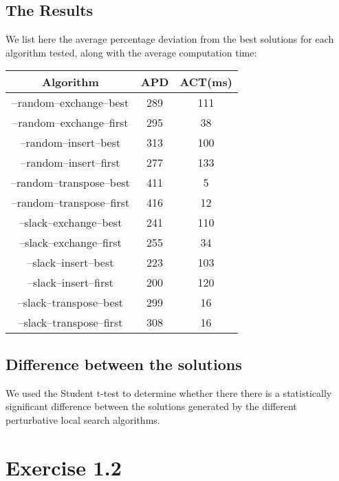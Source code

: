 \subsection{The Results}
We list here the average percentage deviation from the best solutions for each algorithm tested, along with the average computation time:

\begin{center}
	\begin{tabular}{|c|c|c|} \hline
		Algorithm & APD & ACT(ms) \\ \hline \hline
		
		--random--exchange--best		& 289	& 111 \\ \hline
		--random--exchange--first	& 295	& 38 \\ \hline
		--random--insert--best		& 313	& 100 \\ \hline
		--random--insert--first		& 277	& 133 \\ \hline
		--random--transpose--best	& 411	& 5 \\ \hline
		--random--transpose--first	& 416	& 12 \\ \hline
		--slack--exchange--best		& 241	& 110 \\ \hline
		--slack--exchange--first		& 255	& 34 \\ \hline
		--slack--insert--best		& 223	& 103 \\ \hline
		--slack--insert--first		& 200	& 120 \\ \hline
		--slack--transpose--best		& 299	& 16 \\ \hline
		--slack--transpose--first	& 308	& 16 \\ \hline
	\end{tabular}
\end{center}

\subsection{Difference between the solutions}
We used the Student t-test to determine whether there there is a statistically significant difference between the solutions generated by the different perturbative local search algorithms.

\section{Exercise 1.2}

